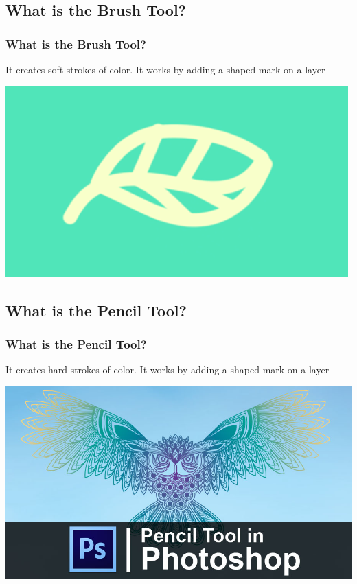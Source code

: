 \documentclass{beamer}
\begin{document}
			\subsection{What is the Brush Tool?}		
\begin{frame}
	\frametitle{What is the Brush Tool?}
	\begin{outline}
		\1 It creates soft strokes of color.
		\1 It works by adding a shaped mark on a layer
	\end{outline}
	\begin{center}
		\includegraphics[width=.7\textwidth]{images/brush.png}
	\end{center}
\end{frame}

			\subsection{What is the Pencil Tool?}		
\begin{frame}
	\frametitle{What is the Pencil Tool?}
	\begin{outline}
		\1 It creates hard strokes of color.
		\1 It works by adding a shaped mark on a layer
	\end{outline}
		\begin{center}
	\includegraphics[width = 1.0\textwidth]{images/Pencil-Tool-in-Photoshop.jpg}
\end{center}
\end{frame}
\end{document}
